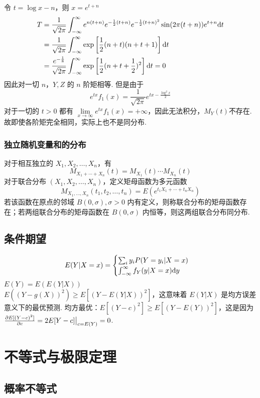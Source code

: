 \documentclass[./main.tex]{subfiles}
\begin{document}
令 $t=\log x-n$，则 $x=e^{t+n}$
\begin{align*}
    T&=\frac{1}{\sqrt{2\pi}}\int_{-\infty}^{\infty}e^{n(t+n)}e^{-\frac{1}{2}(t+n)}e^{-\frac{1}{2}(t+n)^2}\sin(2\pi(t+n))e^{t+n}\text{d}t\\
    &=\frac{1}{\sqrt{2\pi}}\int_{-\infty}^{\infty}\exp\left[\frac{1}{2}(n+t)(n+t+1)\right]\text{d}t\\
    &=\frac{e^{-\frac{1}{8}}}{\sqrt{2\pi}}\int_{-\infty}^{\infty}\exp\left[\frac{1}{2}(n+t+\frac{1}{2})^2\right]\text{d}t=0
\end{align*}
因此对一切 $n$，$Y,Z$ 的 $n$ 阶矩相等. 但是由于 $$e^{tx}f_1(x)=\frac{1}{\sqrt{2\pi}}e^{tx-\frac{\log^2x}{2}}$$ 对于一切的 $t>0$ 都有 $\lim\limits_{x\rightarrow\infty}e^{tx}f_1(x)=+\infty$，因此无法积分，$M_Y(t)$不存在. 故即使各阶矩完全相同，实际上也不是同分布. 
\subsubsection{独立随机变量和的分布}
对于相互独立的 $X_1,X_2,\dots,X_n$，有
\begin{equation}
    M_{X_1+\cdots+X_n}(t)=M_{X_1}(t)\cdots M_{X_n}(t)
\end{equation}
\indent 对于联合分布 $(X_1,X_2,\dots,X_n)$，定义矩母函数为多元函数
\begin{equation}
    M_{X_1,\dots,X_n}(t_1,t_2,\dots,t_n)=E(e^{t_1X_1+\cdots+t_nX_n})
\end{equation}
若该函数在原点的邻域 $B(0,\sigma),\sigma>0$ 内有定义，则称联合分布的矩母函数存在；若两组联合分布的矩母函数在 $B(0,\sigma)$ 内恒等，则这两组联合分布同分布. 
\subsection{条件期望}
$$E(Y|X=x)=\begin{cases}\sum_iy_iP(Y=y_i|X=x)\\\int_{-\infty}^{\infty}f_Y(y|X=x)\text{d}y\end{cases}$$
$E(Y)=E(E(Y|X))$\\
$E((Y-g(X))^2)\ge E[(Y-E(Y|X))^2]$，这意味着 $E(Y|X)$ 是均方误差意义下的最优预测. 均方最优：$E[(Y-c)^2]\ge E[(Y-E(Y))^2]$，这是因为 $\frac{\partial E[(Y-c)^2]}{\partial c}=2E[Y-c]\big|_{c=E(Y)}=0$. 
\section{不等式与极限定理}
\subsection{概率不等式}
\end{document}
